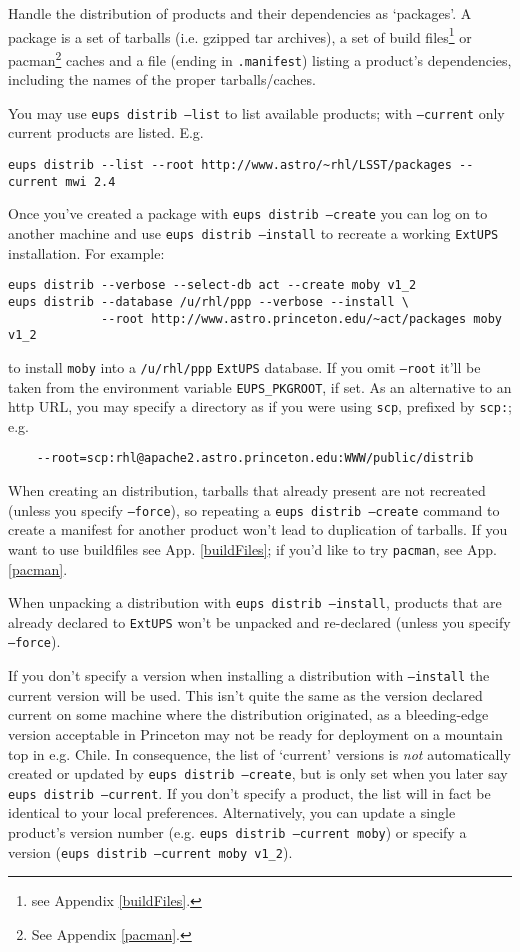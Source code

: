 \documentclass{article}
\newcommand{\code}[1]{\texttt{#1}}
\newcommand{\file}[1]{\texttt{#1}}
\newcommand{\eups}{\code{ExtUPS}}
\newcommand{\pacman}{\code{pacman}}
\begin{document}
\begin{itemize}
Handle the distribution of products and their dependencies as `packages'. A
package is a set of tarballs (i.e. gzipped tar archives), a set of build files\footnote{%
  see Appendix \ref{buildFiles}.
} or pacman\footnote{%
  See Appendix \ref{pacman}.
}
caches and
a file (ending in \code{.manifest})
listing a product's dependencies, including the names of the proper tarballs/caches. 

You may use \code{eups distrib --list} to list available products; with \code{--current}
only current products are listed.  E.g.
\begin{verbatim}
eups distrib --list --root http://www.astro/~rhl/LSST/packages --current mwi 2.4
\end{verbatim}

Once you've created a package with \code{eups distrib --create} you can log on to
another machine and use \code{eups distrib --install} to
recreate a working \eups{} installation.  For example:
\begin{verbatim}
eups distrib --verbose --select-db act --create moby v1_2
eups distrib --database /u/rhl/ppp --verbose --install \
             --root http://www.astro.princeton.edu/~act/packages moby v1_2
\end{verbatim}
to install \code{moby} into a \file{/u/rhl/ppp} \eups{} database. If you omit
\code{--root} it'll be taken from the environment variable \code{EUPS\_PKGROOT},
if set.  As an alternative to an http URL, you may specify a directory as
if you were using \code{scp}, prefixed by \code{scp:}; e.g.
\begin{verbatim}
    --root=scp:rhl@apache2.astro.princeton.edu:WWW/public/distrib
\end{verbatim}

When creating an distribution, tarballs that already present are not recreated
(unless you specify \code{--force}),
so repeating a \code{eups distrib --create} command to create a manifest for another
product won't lead to duplication of tarballs.  If you want to use buildfiles
see App. \ref{buildFiles}; if you'd like to try \pacman{}, see App. \ref{pacman}.

When unpacking a distribution with \code{eups distrib --install}, products that are
already declared to \eups{} won't be unpacked and re-declared (unless you specify \code{--force}).

If you don't specify a version when installing a distribution with
\code{--install} the current version will be used.  This isn't quite the same
as the version declared current on some machine where the distribution
originated, as a bleeding-edge version acceptable in Princeton may not
be ready for deployment on a mountain top in e.g. Chile. In
consequence, the list of `current' versions is \textit{not}
automatically created or updated by \code{eups distrib --create}, but is
only set when you later say \code{eups distrib --current}.  If you don't specify
a product, the list will in fact be identical to your local preferences.
Alternatively, you can update a single product's version number (e.g.
\code{eups distrib --current moby}) or specify a version (\code{eups distrib --current moby v1\_2}).


\end{itemize}
\end{document}
